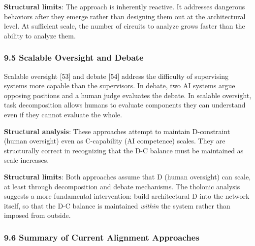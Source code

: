 \documentclass[
  11pt,
  letterpaper,
]{article}
\begin{document}
\textbf{Structural limits}: The approach is inherently reactive. It
addresses dangerous behaviors after they emerge rather than designing
them out at the architectural level. At sufficient scale, the number of
circuits to analyze grows faster than the ability to analyze them.

\subsubsection{9.5 Scalable Oversight and
Debate}\label{scalable-oversight-and-debate}

Scalable oversight {[}53{]} and debate {[}54{]} address the difficulty
of supervising systems more capable than the supervisors. In debate, two
AI systems argue opposing positions and a human judge evaluates the
debate. In scalable oversight, task decomposition allows humans to
evaluate components they can understand even if they cannot evaluate the
whole.

\textbf{Structural analysis}: These approaches attempt to maintain
D-constraint (human oversight) even as C-capability (AI competence)
scales. They are structurally correct in recognizing that the D-C
balance must be maintained as scale increases.

\textbf{Structural limits}: Both approaches assume that D (human
oversight) can scale, at least through decomposition and debate
mechanisms. The tholonic analysis suggests a more fundamental
intervention: build architectural D into the network itself, so that the
D-C balance is maintained \emph{within} the system rather than imposed
from outside.

\subsubsection{9.6 Summary of Current Alignment
Approaches}\label{summary-of-current-alignment-approaches}
\end{document}
